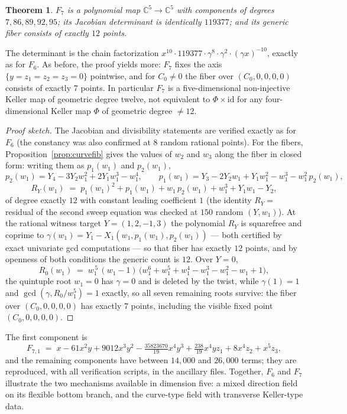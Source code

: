 \documentclass[11pt]{article}
\theoremstyle{plain}
\newtheorem{theorem}{Theorem}[section]
\theoremstyle{definition}
\theoremstyle{remark}
\newcommand{\C}{\mathbb{C}}
\begin{document}
\begin{theorem}\label{thm:F7}
$F_7$ is a polynomial map $\C^5\to\C^5$ with components of degrees
$7,86,89,92,95$; its Jacobian determinant is identically $119377$; and its
generic fiber consists of exactly $12$ points.
\end{theorem}

The determinant is the chain factorization
$x^{10}\cdot119377\cdot\gamma^{8}\cdot\gamma^{2}\cdot(\gamma x)^{-10}$, exactly
as for $F_6$. As before, the proof yields more: $F_7$ fixes the axis
$\{y=z_1=z_2=z_3=0\}$ pointwise, and for $C_0\neq0$ the fiber over
$(C_0,0,0,0,0)$ consists of exactly $7$ points. In particular $F_7$ is a
five-dimensional non-injective Keller map of geometric degree twelve, not
equivalent to $\Phi\times\mathrm{id}$ for any four-dimensional Keller map
$\Phi$ of geometric degree $\neq12$.

\begin{proof}[Proof sketch]
The Jacobian and divisibility statements are verified exactly as for $F_6$
(the constancy was also confirmed at $8$ random rational points). For the
fibers, Proposition~\ref{prop:curvefib} gives the values of $w_2$ and $w_3$
along the fiber in closed form: writing them as $p_1(w_1)$ and $p_2(w_1)$,
\[
p_2(w_1)=Y_4-3Y_2w_1^2+2Y_1w_1^3-w_1^4,\qquad
p_1(w_1)=Y_3-2Y_2w_1+Y_1w_1^2-w_1^3-w_1^2\,p_2(w_1),
\]
\[
R_Y(w_1)\;=\;p_1(w_1)^2+p_1(w_1)+w_1\,p_2(w_1)+w_1^3+Y_1w_1-Y_2 ,
\]
of degree exactly $12$ with constant leading coefficient $1$ (the identity
$R_Y=$ residual of the second sweep equation was checked at $150$ random
$(Y,w_1)$). At the rational witness target $Y=(1,2,-1,3)$ the polynomial
$R_Y$ is squarefree and coprime to $\gamma(w_1)=Y_1-X_1(w_1,p_1(w_1),p_2(w_1))$
--- both certified by exact univariate gcd computations --- so that fiber has
exactly $12$ points, and by openness of both conditions the generic count is
$12$. Over $Y=0$,
\[
R_0(w_1)\;=\;w_1^{\,5}\,(w_1-1)\,
\bigl(w_1^6+w_1^5+w_1^4-w_1^3-w_1^2-w_1+1\bigr),
\]
the quintuple root $w_1=0$ has $\gamma=0$ and is deleted by the twist, while
$\gamma(1)=1$ and $\gcd(\gamma,R_0/w_1^5)=1$ exactly, so all seven remaining
roots survive: the fiber over $(C_0,0,0,0,0)$ has exactly $7$ points,
including the visible fixed point $(C_0,0,0,0,0)$.
\end{proof}

The first component is
\[
F_{7,1}\;=\;x-61x^2y+9012x^3y^2-\tfrac{35823670}{19}x^4y^3
+\tfrac{238}{19}x^4yz_1+8x^4z_2+x^5z_3 ,
\]
and the remaining components have between $14{,}000$ and $26{,}000$ terms;
they are reproduced, with all verification scripts, in the ancillary files.
Together, $F_6$ and $F_7$ illustrate the two mechanisms available in dimension
five: a mixed direction field on its flexible bottom branch, and the
curve-type field with transverse Keller-type data.
\end{document}
